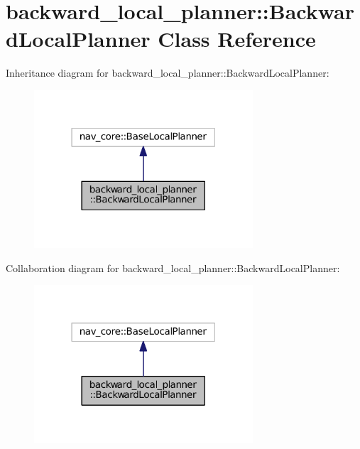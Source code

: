 \hypertarget{classbackward__local__planner_1_1BackwardLocalPlanner}{}\section{backward\+\_\+local\+\_\+planner\+:\+:Backward\+Local\+Planner Class Reference}
\label{classbackward__local__planner_1_1BackwardLocalPlanner}


Inheritance diagram for backward\+\_\+local\+\_\+planner\+:\+:Backward\+Local\+Planner\+:
\nopagebreak
\begin{figure}[H]
\begin{center}
\leavevmode
\includegraphics[width=231pt]{classbackward__local__planner_1_1BackwardLocalPlanner__inherit__graph}
\end{center}
\end{figure}


Collaboration diagram for backward\+\_\+local\+\_\+planner\+:\+:Backward\+Local\+Planner\+:
\nopagebreak
\begin{figure}[H]
\begin{center}
\leavevmode
\includegraphics[width=231pt]{classbackward__local__planner_1_1BackwardLocalPlanner__coll__graph}
\end{center}
\end{figure}
